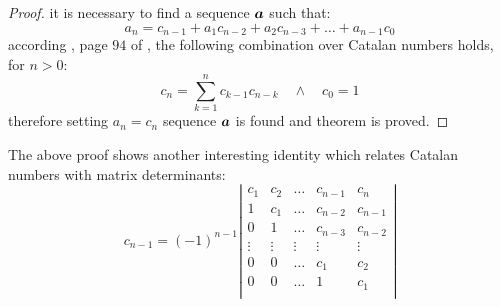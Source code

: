 \begin{proof}
    it is necessary to find a sequence $\boldsymbol{a}$ such that:
    \begin{displaymath}                
        a_{n} = c_{n-1}+a_{1}c_{n-2}+a_{2}c_{n-3}+\ldots+a_{n-1}c_{0}
    \end{displaymath}                
    according \citeauthor{feller:intro:combinatorial:analysis}, page $94$ of
    \cite{feller:intro:combinatorial:analysis}, the following combination over
    Catalan numbers holds, for $n>0$:
    \begin{displaymath}                
        c_{n}=\sum_{k=1}^{n}{c_{k-1}c_{n-k}}\quad\wedge\quad c_{0}=1
    \end{displaymath}                
    therefore setting $a_{n}=c_{n}$ sequence $\boldsymbol{a}$ is found and theorem
    is proved.

\end{proof}

The above proof shows another interesting identity which relates Catalan numbers
with matrix determinants:
\begin{displaymath}                
    c_{n-1} = (-1)^{n-1}
        \left|
        \begin{array}{ccccc}
            c_1 & c_2 & \ldots & c_{n-1} & c_{n}\\
            1 & c_1 & \ldots & c_{n-2} & c_{n-1}\\
            0   & 1 & \ldots & c_{n-3} & c_{n-2}\\
            \vdots & \vdots & \vdots & \vdots & \vdots\\
            0 & 0 & \ldots & c_{1} & c_{2}\\
            0 & 0 & \ldots & 1 & c_{1}\\
        \end{array}
        \right|
\end{displaymath}                

